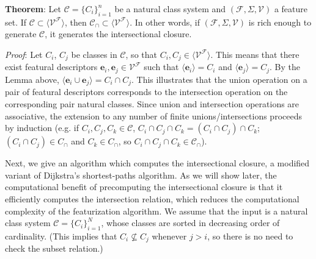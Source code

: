 \documentclass[11pt, oneside]{article}   	%
\begin{document}
\vspace{\baselineskip} \noindent \textbf{Theorem}: Let $\mathcal C = \{C_i\}_{i=1}^n$ be a natural class system and $(\mathcal F, \Sigma, \mathcal V)$ a feature set. If $\mathcal C \subset \langle \mathcal V^\mathcal F \rangle $, then $\mathcal C_\cap \subset\langle \mathcal V^\mathcal F \rangle $. In other words, if $(\mathcal F, \Sigma, \mathcal V)$ is rich enough to generate $\mathcal C$, it generates the intersectional closure.

\textit{Proof}: Let $C_i$, $C_j$ be classes in $\mathcal C$, so that $C_i, C_j \in \langle \mathcal V^\mathcal F \rangle$.
This means that there exist featural descriptors $\mathbf{e}_i, \mathbf{e}_j \in \mathcal V^\mathcal F$ such that $\langle \mathbf{e}_i \rangle = C_i$ and $\langle \mathbf{e}_j \rangle = C_j$. By the Lemma above, $\langle \mathbf{e}_i \cup \mathbf{e}_j \rangle = C_i \cap C_j$. This illustrates that the union operation on a pair of featural descriptors corresponds to the intersection operation on the corresponding pair natural classes. Since union and intersection operations are associative, the extension to any number of finite unions/intersections proceeds by induction (e.g. if $C_i, C_j, C_k \in \mathcal C$, $C_i \cap C_j \cap C_k = (C_i \cap C_j) \cap C_k$; $(C_i \cap C_j) \in C_\cap$ and $C_k \in C_{\cap}$, so $C_i \cap C_j \cap C_k \in \mathcal C_\cap$).

\vspace{\baselineskip} Next, we give an algorithm which computes the intersectional closure, a modified variant of Dijkstra's shortest-paths algorithm. As we will show later, the computational benefit of precomputing the intersectional closure is that it efficiently computes the intersection relation, which reduces the computational complexity of the featurization algorithm. We assume that the input is a natural class system $\mathcal C = \{C_i\}_{i=1}^N$, whose classes are sorted in decreasing order of cardinality. (This implies that $C_i \nsubseteq C_j$ whenever $j > i$, so there is no need to check the subset relation.)
\end{document}
